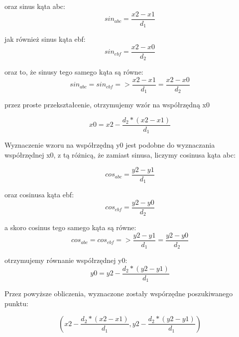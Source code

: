 oraz sinus kąta abc:
\begin{equation}
sin_{abc} = \frac{x2 - x1}{d_1}
\end{equation}\newline

jak również sinus kąta ebf:
\begin{equation}
sin_{ebf} = \frac{x2 - x0}{d_2}
\end{equation}\newline

oraz to, że sinusy tego samego kąta są równe:
\begin{equation}
sin_{abc} = sin_{ebf} => \frac{x2 - x1}{d_1} = \frac{x2 - x0}{d_2}
\end{equation}\newline

przez proste przekształcenie, otrzymujemy wzór na współrzędną x0

\begin{equation}
x0 = x2 - \frac{d_2*(x2 - x1)}{d_1}
\end{equation}\newline

Wyznaczenie wzoru na współrzędną y0 jest podobne do wyznaczania współrzędnej x0, z tą różnicą, że zamiast sinusa, liczymy cosinusa kąta abc:

\begin{equation}
cos_{abc} = \frac{y2 - y1}{d_1}
\end{equation}\newline

oraz cosinusa kąta ebf:
\begin{equation}
cos_{ebf} = \frac{y2 - y0}{d_2}
\end{equation}\newline

a skoro cosinus tego samego kąta są równe:
\begin{equation}
cos_{abc} = cos_{ebf} => \frac{y2 - y1}{d_1} = \frac{y2 - y0}{d_2}
\end{equation}\newline

otrzymujemy równanie współrzędnej y0:
\begin{equation}
y0 = y2 - \frac{d_2*(y2 - y1)}{d_1}
\end{equation}\newline

Przez powyższe obliczenia, wyznaczone zostały wspórzędne poszukiwanego punktu:

\begin{equation} \label{eq:calculatedCoordinates}
(x2 - \frac{d_2*(x2 - x1)}{d_1}, y2 - \frac{d_2*(y2 - y1)}{d_1})
\end{equation}\newline


